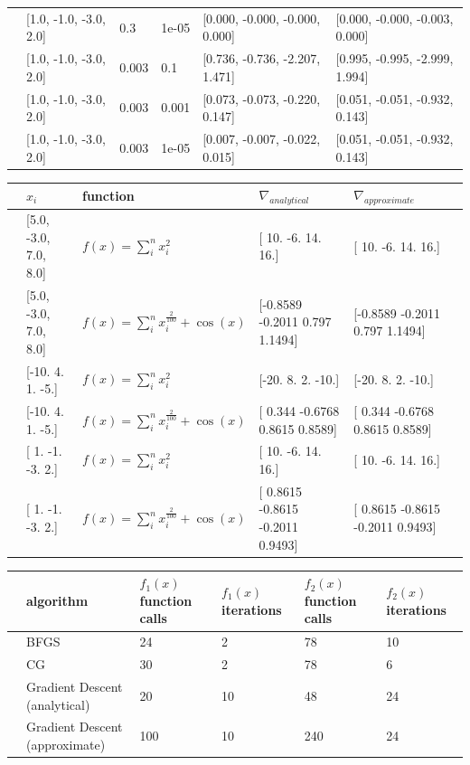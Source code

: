 \documentclass[10pt]{article}
\begin{document}
\begin{table}
\begin{tabular}{llllll}
 &   [1.0, -1.0, -3.0, 2.0] &    0.3 &  1e-05 &  [0.000, -0.000, -0.000, 0.000] &   [0.000, -0.000, -0.003, 0.000] \\
 &   [1.0, -1.0, -3.0, 2.0] &  0.003 &    0.1 &  [0.736, -0.736, -2.207, 1.471] &   [0.995, -0.995, -2.999, 1.994] \\
 &   [1.0, -1.0, -3.0, 2.0] &  0.003 &  0.001 &  [0.073, -0.073, -0.220, 0.147] &   [0.051, -0.051, -0.932, 0.143] \\
 &   [1.0, -1.0, -3.0, 2.0] &  0.003 &  1e-05 &  [0.007, -0.007, -0.022, 0.015] &   [0.051, -0.051, -0.932, 0.143] \\
\bottomrule
\end{tabular}
\end{table}

\begin{table}
\begin{tabular}{llllll}
\toprule
{} &   $x_{i}$  &  function &   $\nabla_{analytical}$  & $\nabla_{approximate}$ \\
\midrule
&    [5.0, -3.0, 7.0, 8.0] & $f(x) = \sum_i^n x_i^2$ &  [ 10.  -6.  14.  16.] & [ 10.  -6.  14.  16.]\\
&    [5.0, -3.0, 7.0, 8.0] & $f(x) = \sum_i^n x_i^{\frac{2}{100}} + \cos(x)$ & [-0.8589 -0.2011  0.797   1.1494] &[-0.8589 -0.2011  0.797   1.1494] \\
&    [-10.   4.   1.  -5.] & $f(x) = \sum_i^n x_i^2$ &   [-20.   8.   2. -10.] &  [-20.   8.   2. -10.]\\
&    [-10.   4.   1.  -5.] & $f(x) = \sum_i^n x_i^{\frac{2}{100}} + \cos(x)$ &[ 0.344  -0.6768  0.8615  0.8589]&[ 0.344  -0.6768  0.8615  0.8589] \\
&    [ 1. -1. -3.  2.] & $f(x) = \sum_i^n x_i^2$ &  [ 10.  -6.  14.  16.] & [ 10.  -6.  14.  16.]\\
&    [ 1. -1. -3.  2.] & $f(x) = \sum_i^n x_i^{\frac{2}{100}} + \cos(x)$ & [ 0.8615 -0.8615 -0.2011  0.9493] & [ 0.8615 -0.8615 -0.2011  0.9493] \\
\bottomrule
\end{tabular}
\end{table}

\begin{table}
\begin{tabular}{llllll}
\toprule
{} & algorithm & $f_1(x)$ function calls & $f_1(x)$ iterations &  $f_2(x)$ function calls &  $f_2(x)$ iterations \\
\midrule
  & BFGS & 24 & 2 & 78 & 10 \\
  & CG & 30 & 2 & 78 & 6 \\
  & Gradient Descent (analytical) & 20 & 10 & 48 & 24 \\ 
  & Gradient Descent (approximate) & 100 & 10 & 240 & 24 \\
\bottomrule
\end{tabular}
\end{table}
\end{document}
